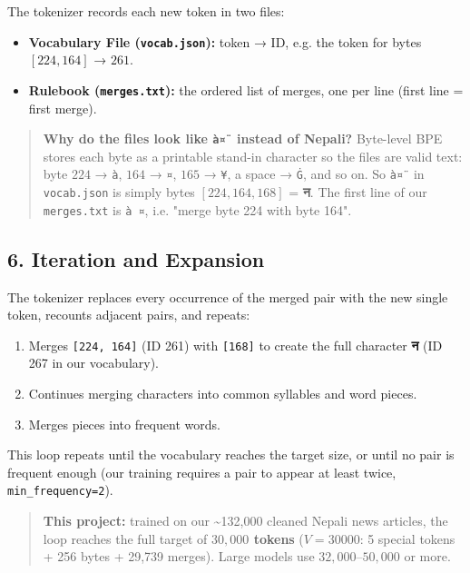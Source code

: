 \documentclass[11pt,a4paper,oneside]{report}
\providecommand{\tightlist}{\setlength{\itemsep}{0pt}\setlength{\parskip}{0pt}}
\begin{document}
The tokenizer records each new token in two files:

\begin{itemize}
\tightlist
\item
  \textbf{Vocabulary File (\texttt{vocab.\allowbreak{}json}):} token → ID, e.g. the token for bytes \([224, 164]\) → \(261\).
\item
  \textbf{Rulebook (\texttt{merges.\allowbreak{}txt}):} the ordered list of merges, one per line (first line = first merge).
\end{itemize}

\begin{quote}
\textbf{Why do the files look like \texttt{à¤¨} instead of Nepali?} Byte-level BPE stores each byte as a printable stand-in character so the files are valid text: byte \(224\) → \texttt{à}, \(164\) → \texttt{¤}, \(165\) → \texttt{¥}, a space → \texttt{Ġ}, and so on. So \texttt{à¤¨} in \texttt{vocab.\allowbreak{}json} is simply bytes \([224, 164, 168]\) = \textbf{न}. The first line of our \texttt{merges.\allowbreak{}txt} is \texttt{à\ ¤}, i.e. "merge byte 224 with byte 164".
\end{quote}

\subsection{6. Iteration and Expansion}\label{6-iteration-and-expansion}

The tokenizer replaces every occurrence of the merged pair with the new single token, recounts adjacent pairs, and repeats:

\begin{enumerate}
\def\labelenumi{\arabic{enumi}.}
\tightlist
\item
  Merges \texttt{{[}224,\ 164{]}} (ID 261) with \texttt{{[}168{]}} to create the full character \textbf{न} (ID 267 in our vocabulary).
\item
  Continues merging characters into common syllables and word pieces.
\item
  Merges pieces into frequent words.
\end{enumerate}

This loop repeats until the vocabulary reaches the target size, or until no pair is frequent enough (our training requires a pair to appear at least twice, \texttt{min\_\allowbreak{}frequency=2}).

\begin{quote}
\textbf{This project:} trained on our \textasciitilde132,000 cleaned Nepali news articles, the loop reaches the full target of \textbf{\(30,000\) tokens} (\(V = 30000\): 5 special tokens + 256 bytes + 29,739 merges). Large models use \(32,000\)--\(50,000\) or more.
\end{quote}
\end{document}
